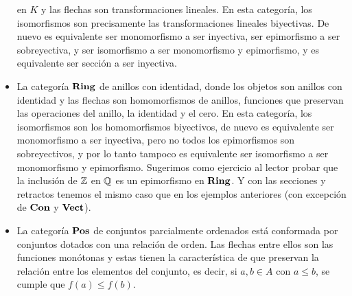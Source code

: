 \documentclass{comunicaciones}
\begin{document}
\begin{ej}
\begin{itemize}
        en $K$ y las flechas son transformaciones lineales. En esta categoría, los isomorfismos son precisamente las transformaciones lineales biyectivas. 
        De nuevo es equivalente ser monomorfismo a ser inyectiva, ser epimorfismo a ser sobreyectiva, y ser isomorfismo a ser monomorfismo y epimorfismo, y
        es equivalente ser sección a ser inyectiva.
        \item La categoría $\mathbf{Ring}$ de anillos con identidad, donde los objetos son anillos con identidad y las flechas son homomorfismos de anillos, funciones
        que preservan las operaciones del anillo, la identidad y el cero. En esta categoría, los isomorfismos son los homomorfismos biyectivos, de nuevo es
        equivalente ser monomorfismo a ser inyectiva, pero no todos los epimorfismos son sobreyectivos, y por lo tanto tampoco es equivalente ser isomorfismo
        a ser monomorfismo y epimorfismo. Sugerimos como ejercicio al lector probar que la inclusión de $\mathbb Z$ en $\mathbb Q$ es un epimorfismo en $\mathbf{Ring}$. Y con las secciones y
        retractos tenemos el mismo caso que en los ejemplos anteriores (con excepción de $\mathbf{Con}$ y $\mathbf{Vect}$).
        \item La categoría $\mathbf{Pos}$ de conjuntos parcialmente ordenados está conformada por conjuntos dotados con una relación de orden. Las flechas entre ellos son las funciones monótonas y estas tienen la característica de que preservan la relación entre los elementos del conjunto, es decir, si $a, b\in A$ con $a\leq b$, se cumple que $f(a)\leq f(b)$. 
    \end{itemize}
\end{ej}
\end{document}
